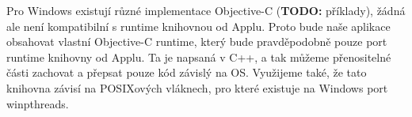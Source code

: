 \documentclass[12pt]{article}
\begin{document}
Pro Windows existují různé implementace Objective-C (\textbf{TODO:} příklady), žádná ale není kompatibilní s runtime knihovnou od Applu.
Proto bude naše aplikace obsahovat vlastní Objective-C runtime, který bude pravděpodobně pouze port runtime knihovny od Applu.
Ta je napsaná v C++, a tak můžeme přenositelné části zachovat a přepsat pouze kód závislý na OS.
Využijeme také, že tato knihovna závisí na POSIXových vláknech, pro které existuje na Windows port winpthreads.
\end{document}
